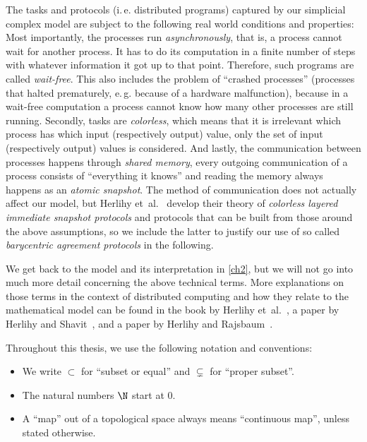 The tasks and protocols (i.\,e. distributed programs) captured by our simplicial
complex model are subject to the following real world conditions and properties:
Most importantly, the processes run \emph{asynchronously}, that is, a process
cannot wait for another process. It has to do its computation in a finite number
of steps with whatever information it got up to that point. Therefore, such
programs are called \emph{wait-free}. This also includes the problem of
\enquote{crashed processes} (processes that halted prematurely, e.\,g. because
of a hardware malfunction), because in a wait-free computation a process cannot
know how many other processes are still running. Secondly, tasks are
\emph{colorless}, which means that it is irrelevant which process has which
input (respectively output) value, only the set of input (respectively output)
values is considered. And lastly, the communication between processes happens
through \emph{shared memory}, every outgoing communication of a process consists
of \enquote{everything it knows} and reading the memory always happens as an
\emph{atomic snapshot}. The method of communication does not actually affect
our model, but Herlihy et~al.~\cite{bookc:herlihyetal13} develop their theory of
\emph{colorless layered immediate snapshot protocols} and protocols that can be
built from those around the above assumptions, so we include the latter to
justify our use of so called \emph{barycentric agreement protocols} in the
following.

We get back to the model and its interpretation in \cref{ch2}, but we will not
go into much more detail concerning the above technical terms. More explanations
on those terms in the context of distributed computing and how they relate to
the mathematical model can be found in the book by
Herlihy et~al.~\cite{bookc:herlihyetal13}, a paper by
Herlihy and Shavit~\cite{paper:herlihyshavit99}, and a paper by
Herlihy and Rajsbaum~\cite{paper:herlihyrajsbaum03}.

\bigskip
Throughout this thesis, we use the following notation and conventions:
\begin{itemize}
    \item
        We write $\subset$ for \enquote{subset or equal}
        and $\subsetneq$ for \enquote{proper subset}.
        
    \item
        The natural numbers $\N$ start at $0$.
        
    \item
        A \enquote{map} out of a topological space always means
        \enquote{continuous map}, unless stated otherwise.
\end{itemize}

